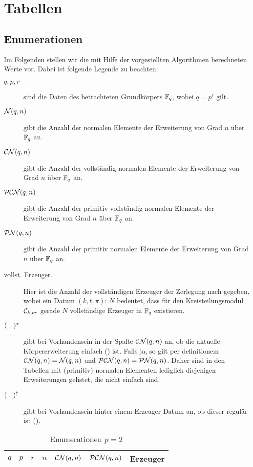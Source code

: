 \chapter{Tabellen}

\section{Enumerationen}

Im Folgenden stellen wir die mit Hilfe der vorgestellten Algorithmen
berechneten Werte vor. Dabei ist folgende Legende zu beachten:
\begin{description}
  \item[$q, p,r$] sind die Daten des betrachteten Grundkörpers $\F_q$, wobei
    $q = p^r$ gilt.
  \item[$\cal N(q,n)$] gibt die Anzahl der normalen Elemente
    der Erweiterung von Grad $n$ über $\F_q$ an.
  \item[$\CN(q,n)$] gibt die Anzahl der vollständig normalen Elemente
    der Erweiterung von Grad $n$ über $\F_q$ an.
  \item[$\PCN(q,n)$] gibt die Anzahl der primitiv vollständig normalen Elemente 
    der Erweiterung von Grad $n$ über $\F_q$ an.
  \item[$\PN(q,n)$] gibt die Anzahl der primitiv normalen Elemente 
    der Erweiterung von Grad $n$ über $\F_q$ an.
  \item[\normalfont vollst. Erzeuger.] Hier ist die Anzahl der vollständigen Erzeuger
    der Zerlegung nach  gegeben, wobei ein Datum
    $(k,t,\pi):\, N$ bedeutet, dass für den Kreisteilungsmodul 
    $\C_{k,t\pi}$ gerade $N$ vollständige Erzeuger in $\F_q$ existieren.
  \item[$(\speq.)^\ast$] gibt bei Vorhandensein in der Spalte $\CN(q,n)$ an, 
    ob die aktuelle Körpererweiterung einfach () ist.
    Falls ja, so gilt per definitionem 
    $\CN(q,n) = \cal N(q,n)$ und $\PCN(q,n) = \PN(q,n)$.
    Daher sind in den Tabellen mit (primitiv) normalen Elementen lediglich
    diejenigen Erweiterungen gelistet, die nicht einfach sind.
  \item[$(\speq.)^\dagger$] gibt bei Vorhandensein hinter einem Erzeuger-Datum
    an, ob dieser regulär ist ().
\end{description}

\begin{longtable}[h]{llllllp{7cm}}
  \caption{Enumerationen $p=2$}\\
  $q$ & $p$ & $r$ & $n$ & $\CN(q,n)$ & $\PCN(q,n)$ & Erzeuger \\\hline
  \endhead
  
\end{longtable}

